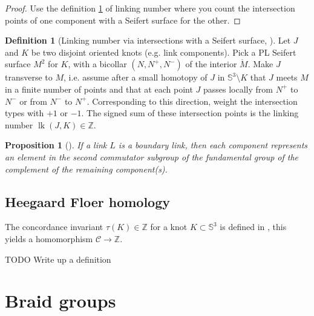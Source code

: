 \documentclass[nobib]{tufte-book} %
\newtheorem{proposition}{Proposition}
\theoremstyle{definition}
\newtheorem{definition}{Definition}
\theoremstyle{remark}
\DeclareMathOperator{\lk}{lk}
\newcommand{\sphere}[1]{\mathbb{S}^{#1}}
\newcommand{\Z}{\mathbb{Z}}
\begin{document}
\begin{proof}
	Use the definition \ref{def:linking_numbers_via_intersections_with_Seifert_surface} 
	of linking number where you count
	the intersection points of one component with a Seifert surface for the
	other.
\end{proof}

\begin{definition}[{Linking number via intersections with a Seifert surface,
	\citep[5.D.(2)]{rolfsen2003knots}}]
	\label{def:linking_numbers_via_intersections_with_Seifert_surface}
	Let $J$ and $K$ be two disjoint oriented knots (e.g. link components).
	Pick a PL Seifert surface $M^{2}$ for $K$, with
	a bicollar $(N, N^{+}, N^{-})$ of the interior $\mathring{M}$.
	Make $J$ transverse to $M$, i.e. assume after a small
	homotopy of $J$ in $\sphere{3} \setminus K$ that
	$J$ meets $M$ in a finite number of points
	and that at each point $J$ passes locally
	from $N^{+}$ to $N^{-}$ or from $N^{-}$ to $N^{+}$.
	Corresponding to this direction, weight the intersection types
	with $+1$ or $-1$.
	The signed sum of these intersection points is the linking
	number $\lk(J, K) \in \Z$.
\end{definition}

\begin{proposition}[{\citep[5.E.8]{rolfsen2003knots}}]
	If a link $L$ is a boundary link, then each component
	represents an element
	in the second commutator subgroup
	of the fundamental group of the complement
	of the remaining component(s).
\end{proposition}


\subsection{Heegaard Floer homology}

The concordance invariant $\tau(K) \in \Z$ for a knot $K \subset \sphere{3}$
is defined in \citep{ozsvath2003knot},
this yields a homomorphism $\mathcal{C} \rightarrow \Z$.

TODO Write up a definition




\section{Braid groups}
\end{document}
